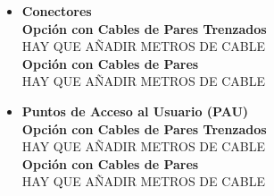 \begin{itemize}
	\item \textbf{Conectores}\\
	\textbf{Opción con Cables de Pares Trenzados}\\
	HAY QUE AÑADIR METROS DE CABLE\\
	\textbf{Opción con Cables de Pares}\\
	HAY QUE AÑADIR METROS DE CABLE
\end{itemize}

\begin{itemize}
	\item \textbf{Puntos de Acceso al Usuario (PAU)}\\
	\textbf{Opción con Cables de Pares Trenzados}\\
	HAY QUE AÑADIR METROS DE CABLE\\
	\textbf{Opción con Cables de Pares}\\
	HAY QUE AÑADIR METROS DE CABLE
\end{itemize}
